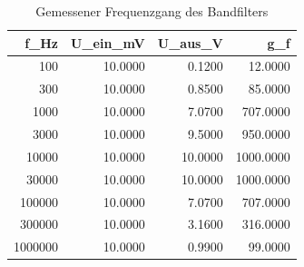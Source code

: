 \begin{table}
\caption{Gemessener Frequenzgang des Bandfilters}
\label{tab:frequenzgang}
\begin{tabular}{rrrr}
\toprule
f_Hz & U_ein_mV & U_aus_V & g_f \\
\midrule
100 & 10.0000 & 0.1200 & 12.0000 \\
300 & 10.0000 & 0.8500 & 85.0000 \\
1000 & 10.0000 & 7.0700 & 707.0000 \\
3000 & 10.0000 & 9.5000 & 950.0000 \\
10000 & 10.0000 & 10.0000 & 1000.0000 \\
30000 & 10.0000 & 10.0000 & 1000.0000 \\
100000 & 10.0000 & 7.0700 & 707.0000 \\
300000 & 10.0000 & 3.1600 & 316.0000 \\
1000000 & 10.0000 & 0.9900 & 99.0000 \\
\bottomrule
\end{tabular}
\end{table}
